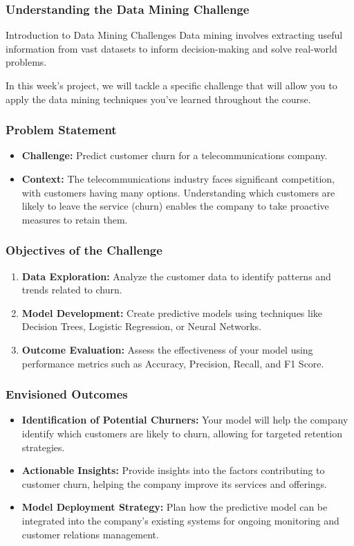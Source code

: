 \documentclass{beamer}
\begin{document}
\begin{frame}
    \frametitle{Understanding the Data Mining Challenge}
    \begin{block}{Introduction to Data Mining Challenges}
        Data mining involves extracting useful information from vast datasets to inform decision-making and solve real-world problems.
    \end{block}
    In this week's project, we will tackle a specific challenge that will allow you to apply the data mining techniques you've learned throughout the course.
\end{frame}

\begin{frame}
    \frametitle{Problem Statement}
    \begin{itemize}
        \item \textbf{Challenge:} Predict customer churn for a telecommunications company.
        \item \textbf{Context:} The telecommunications industry faces significant competition, with customers having many options. Understanding which customers are likely to leave the service (churn) enables the company to take proactive measures to retain them.
    \end{itemize}
\end{frame}

\begin{frame}
    \frametitle{Objectives of the Challenge}
    \begin{enumerate}
        \item \textbf{Data Exploration:} Analyze the customer data to identify patterns and trends related to churn.
        \item \textbf{Model Development:} Create predictive models using techniques like Decision Trees, Logistic Regression, or Neural Networks.
        \item \textbf{Outcome Evaluation:} Assess the effectiveness of your model using performance metrics such as Accuracy, Precision, Recall, and F1 Score.
    \end{enumerate}
\end{frame}

\begin{frame}
    \frametitle{Envisioned Outcomes}
    \begin{itemize}
        \item \textbf{Identification of Potential Churners:} Your model will help the company identify which customers are likely to churn, allowing for targeted retention strategies.
        \item \textbf{Actionable Insights:} Provide insights into the factors contributing to customer churn, helping the company improve its services and offerings.
        \item \textbf{Model Deployment Strategy:} Plan how the predictive model can be integrated into the company's existing systems for ongoing monitoring and customer relations management.
    \end{itemize}
\end{frame}
\end{document}
